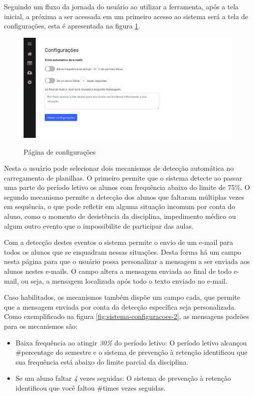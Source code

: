 Seguindo um fluxo da jornada do usuário ao utilizar a ferramenta, após a tela inicial, a próxima a ser acessada em um primeiro acesso ao sistema será a tela de configurações, esta é apresentada na figura  \ref{fig:sistema-configuracoes-1}. 

\begin{figure}[!htb]
    \centering
    \caption{Página de configurações}
    \includegraphics[width=1\textwidth]{./dados/figuras/sistema/sistema-configuracoes-1}
    \label{fig:sistema-configuracoes-1}
\end{figure}

Nesta o usuário pode selecionar dois mecanismos de detecção automática no carregamento de planilhas. 
O primeiro permite que o sistema detecte ao passar uma parte do período letivo os alunos com frequência abaixo do limite de 75\%.
O segundo mecanismo permite a detecção dos alunos que faltaram múltiplas vezes em sequência, o que pode refletir em alguma situação incomum por conta do aluno, como o momento de desistência da disciplina, impedimento médico ou algum outro evento que o impossibilite de participar das aulas.

Com a detecção destes eventos o sistema permite o envio de um e-mail para todos os alunos que se enquadram nessas situações. Desta forma há um campo nesta página para que o usuário possa personalizar a mensagem a ser enviada aos alunos nestes e-mails.
O campo altera a mensagem enviada ao final de todo e-mail, ou seja, a mensagem localizada após todo o texto enviado no e-mail.

Caso habilitados, os mecanismos também dispõe um campo cada, que permite que a mensagem enviada por conta da detecção específica seja personalizada.
Como exemplificado na figura \ref{fig:sistema-configuracoes-2}, as mensagens padrões para os mecanismos são: 

\begin{itemize}
    \item Baixa frequência ao atingir \textit{30\%} do período letivo: O período letivo alcançou \#percentage do semestre e o sistema de prevenção à retenção identificou que sua frequência está abaixo do limite parcial da disciplina.
    \item Se um aluno faltar \textit{4} vezes seguidas: O sistema de prevenção à retenção identificou que você faltou \#times vezes seguidas.
\end{itemize}

